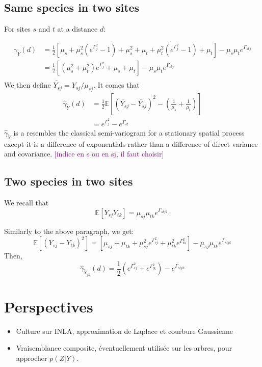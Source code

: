 \documentclass[10pt,a4paper]{article}
\newcommand{\esp}{\mathds{E}}
\newcommand{\RM}[1]{\textcolor{purple}{[#1]}}
\begin{document}
\subsection{Same species in two sites}
For sites $s$ and $t$ at a distance $d$:

\begin{align*}
\gamma_Y(d) &= \frac{1}{2} \left[ \mu_s + \mu_s^2(e^{\Gamma^2_j}-1) + \mu_s^2 + \mu_t+\mu_t^2(e^{\Gamma^2_j}-1) +\mu_t\right] - \mu_s\mu_te^{\Gamma_{stj}}\\
&= \frac{1}{2} \left[ ( \mu_s^2+\mu_t^2)e^{\Gamma^2_j}+ \mu_s+ \mu_t\right] - \mu_s\mu_te^{\Gamma_{stj}}\\
\end{align*}
We then define $\tilde{Y_{sj}} = Y_{sj}/\mu_{sj}$.
It  comes that 
\begin{align*}
 \hat{\gamma}_{\tilde{Y}}(d) &= \frac{1}{2} \esp \left[(\tilde{Y_{sj}}-\tilde{Y_{sj}})^2 - (\frac{1}{\mu_s}+\frac{1}{\mu_t})\right]\\
 &=e^{\Gamma_j^2} - e^{\Gamma_{st}}
\end{align*}
$ \hat{\gamma}_{\tilde{Y}}$ is a resembles the classical semi-variogram for a stationary spatial process except it is a difference of exponentials rather than a difference of direct variance and covariance. 
\RM{indice en s ou en sj, il faut choisir}
\subsection{Two species in two sites}
We recall that
$$\esp[Y_{sj}Y_{tk}]= \mu_{sj}\mu_{tk} e^{\Gamma_{stjk}}.$$


Similarly to the above paragraph, we get:
$$ \esp[(Y_{sj} - Y_{tk})^2] = \left[ \mu_{sj}+\mu_{tk} + \mu_{sj}^2 e^{\Gamma_{sj}^2} + \mu_{tk}^2 e^{\Gamma_{tk}^2}\right] - \mu_{sj}\mu_{tk}e^{\Gamma_{stjk}}$$
Then, $$\hat{\gamma}_{\tilde{Y}_{jk}}(d) = \frac{1}{2} \left(e^{\Gamma_{sj}^2}+ e^{\Gamma_{tk}^2}\right) - e^{\Gamma_{stjk}}$$

\section{Perspectives}
\begin{itemize}
\item Culture sur INLA, approximation de Laplace et courbure Gaussienne
\item Vraisemblance composite, éventuellement utilisée sur les arbres, pour approcher $p(Z|Y)$.
\end{itemize}
\end{document}
